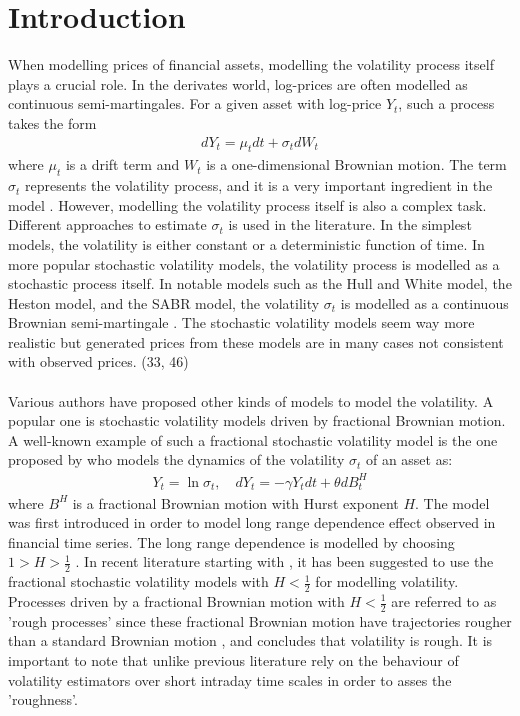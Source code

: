 \documentclass{article}
\begin{document}
\tableofcontents
\newpage
{}
\section{Introduction}
When modelling prices of financial assets, modelling the volatility process itself plays a crucial role. In the derivates world, log-prices are often modelled as continuous semi-martingales. For a given asset with log-price $Y_t$, such a process takes the form
\begin{align}
dY_t = \mu_tdt+\sigma_tdW_t
\end{align}
where $\mu_t$ is a drift term and $W_t$ is a one-dimensional Brownian motion. The term $\sigma_t$ represents the volatility process, and it is a very important ingredient in the model \cite{gatheral}. However, modelling the volatility process itself is also a complex task. Different approaches to estimate $\sigma_t$ is used in the literature. In the simplest models, the volatility is either constant or a deterministic function of time. In more popular stochastic volatility models, the volatility process is modelled as a stochastic process itself. In notable models such as the Hull and White model, the Heston model, and the SABR model, the volatility $\sigma_t$ is modelled as a continuous Brownian semi-martingale \cite{gatheral}. The stochastic volatility models seem way more realistic but generated prices from these models are in many cases not consistent with observed prices. (33, 46)\\\\
Various authors have proposed other kinds of models to model the volatility. A popular one is stochastic volatility models driven  by fractional Brownian motion. A well-known example of such a fractional stochastic volatility model is the one proposed by \cite{comte} who models the dynamics of the volatility $\sigma_t$ of an asset as:
\begin{align}
Y_t = \ln\sigma_t, \quad dY_t = -\gamma Y_t dt+\theta dB^H_t
\end{align}
where $B^H$ is a fractional Brownian motion with Hurst exponent $H$. The model was first introduced in order to model long range dependence effect observed in financial time series. The long range dependence is modelled by choosing $1>H>\frac{1}{2}$ \cite{comte}. In recent literature starting with \cite{gatheral}, it has been suggested to use the fractional stochastic volatility models with $H<\frac{1}{2}$ for modelling volatility. Processes driven by a fractional Brownian motion with $H<\frac{1}{2}$ are referred to as 'rough processes' since these fractional Brownian motion have trajectories rougher than a standard Brownian motion \cite{cont}, and \cite{gatheral} concludes that volatility is rough. It is important to note that \cite{gatheral} unlike previous literature rely on the behaviour of volatility estimators over short intraday time scales in order to asses the 'roughness'.\\\\
\end{document}
